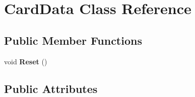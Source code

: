 \hypertarget{classCardData}{\section{Card\-Data Class Reference}
\label{classCardData}
}
\subsection*{Public Member Functions}
\begin{DoxyCompactItemize}
\item 
\hypertarget{classCardData_a77c665bfd5e8b1f17d6b668e888cf9bd}{void {\bfseries Reset} ()}\label{classCardData_a77c665bfd5e8b1f17d6b668e888cf9bd}

\end{DoxyCompactItemize}
\subsection*{Public Attributes}
